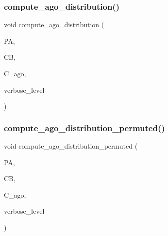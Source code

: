 \subsubsection{\texorpdfstring{compute\+\_\+ago\+\_\+distribution()}{compute\_ago\_distribution()}}
{\footnotesize\ttfamily void compute\+\_\+ago\+\_\+distribution (\begin{DoxyParamCaption}\item[{\mbox{\hyperlink{classprojective__space__with__action}{projective\+\_\+space\+\_\+with\+\_\+action}} $\ast$}]{PA,  }\item[{\mbox{\hyperlink{classclassify__bitvectors}{classify\+\_\+bitvectors}} $\ast$}]{CB,  }\item[{\mbox{\hyperlink{classclassify}{classify}} $\ast$\&}]{C\+\_\+ago,  }\item[{\mbox{\hyperlink{galois_8h_a09fddde158a3a20bd2dcadb609de11dc}{I\+NT}}}]{verbose\+\_\+level }\end{DoxyParamCaption})}

\mbox{\label{projective__space__main_8_c_a1d8c812b2637be8e72d8ae3dfdc8c3df}} 
\subsubsection{\texorpdfstring{compute\+\_\+ago\+\_\+distribution\+\_\+permuted()}{compute\_ago\_distribution\_permuted()}}
{\footnotesize\ttfamily void compute\+\_\+ago\+\_\+distribution\+\_\+permuted (\begin{DoxyParamCaption}\item[{\mbox{\hyperlink{classprojective__space__with__action}{projective\+\_\+space\+\_\+with\+\_\+action}} $\ast$}]{PA,  }\item[{\mbox{\hyperlink{classclassify__bitvectors}{classify\+\_\+bitvectors}} $\ast$}]{CB,  }\item[{\mbox{\hyperlink{classclassify}{classify}} $\ast$\&}]{C\+\_\+ago,  }\item[{\mbox{\hyperlink{galois_8h_a09fddde158a3a20bd2dcadb609de11dc}{I\+NT}}}]{verbose\+\_\+level }\end{DoxyParamCaption})}

